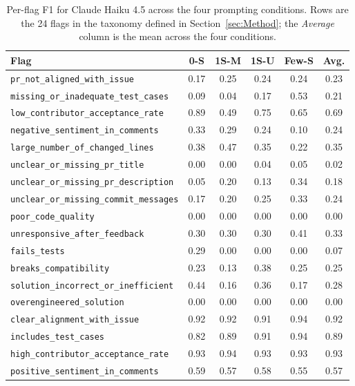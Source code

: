 \begin{table}[!htbp]
\centering
\caption{Per-flag F1 for Claude Haiku 4.5 across the four prompting
conditions. Rows are the 24 flags in the taxonomy defined in
Section~\ref{sec:Method}; the \emph{Average} column is the mean across
the four conditions.}
\label{tab:perflag-claude-haiku-4-5}
\small
\begin{tabular}{lccccc}
\toprule
Flag & 0-S & 1S-M & 1S-U & Few-S & Avg. \\
\midrule
\texttt{pr\_not\_aligned\_with\_issue} & 0.17 & 0.25 & 0.24 & 0.24 & 0.23 \\
\texttt{missing\_or\_inadequate\_test\_cases} & 0.09 & 0.04 & 0.17 & 0.53 & 0.21 \\
\texttt{low\_contributor\_acceptance\_rate} & 0.89 & 0.49 & 0.75 & 0.65 & 0.69 \\
\texttt{negative\_sentiment\_in\_comments} & 0.33 & 0.29 & 0.24 & 0.10 & 0.24 \\
\texttt{large\_number\_of\_changed\_lines} & 0.38 & 0.47 & 0.35 & 0.22 & 0.35 \\
\texttt{unclear\_or\_missing\_pr\_title} & 0.00 & 0.00 & 0.04 & 0.05 & 0.02 \\
\texttt{unclear\_or\_missing\_pr\_description} & 0.05 & 0.20 & 0.13 & 0.34 & 0.18 \\
\texttt{unclear\_or\_missing\_commit\_messages} & 0.17 & 0.20 & 0.25 & 0.33 & 0.24 \\
\texttt{poor\_code\_quality} & 0.00 & 0.00 & 0.00 & 0.00 & 0.00 \\
\texttt{unresponsive\_after\_feedback} & 0.30 & 0.30 & 0.30 & 0.41 & 0.33 \\
\texttt{fails\_tests} & 0.29 & 0.00 & 0.00 & 0.00 & 0.07 \\
\texttt{breaks\_compatibility} & 0.23 & 0.13 & 0.38 & 0.25 & 0.25 \\
\texttt{solution\_incorrect\_or\_inefficient} & 0.44 & 0.16 & 0.36 & 0.17 & 0.28 \\
\texttt{overengineered\_solution} & 0.00 & 0.00 & 0.00 & 0.00 & 0.00 \\
\texttt{clear\_alignment\_with\_issue} & 0.92 & 0.92 & 0.91 & 0.94 & 0.92 \\
\texttt{includes\_test\_cases} & 0.82 & 0.89 & 0.91 & 0.94 & 0.89 \\
\texttt{high\_contributor\_acceptance\_rate} & 0.93 & 0.94 & 0.93 & 0.93 & 0.93 \\
\texttt{positive\_sentiment\_in\_comments} & 0.59 & 0.57 & 0.58 & 0.55 & 0.57 \\

\end{tabular}
\end{table}
